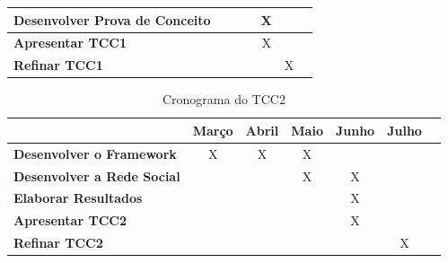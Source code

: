 \begin{table}[h]
\begin{adjustbox}{width=\textwidth}
\begin{tabular}{|l|c|c|c|c|c|c|}
\textbf{Desenvolver Prova de Conceito}          &                             		   &                               			&                              			& X                             		 &                               		  \\ \hline
\textbf{Apresentar TCC1}                        &                             		   &                               			&                              			& X                              		 &                              		  \\ \hline
\textbf{Refinar TCC1}                           &                             		   &                               			&                              			&                               		 & X                              		  \\ \hline
\end{tabular}
\end{adjustbox}
\end{table}

\begin{table}[h]
\centering
\caption{Cronograma do TCC2}
\label{cronograma tcc2}
\begin{tabular}{|l|c|c|c|c|c|c|}
\hline
                                      			& \multicolumn{1}{l|}{\textbf{Março}} & \multicolumn{1}{l|}{\textbf{Abril}} & \multicolumn{1}{l|}{\textbf{Maio}} & \multicolumn{1}{l|}{\textbf{Junho}} & \multicolumn{1}{l|}{\textbf{Julho}} \\ \hline
\textbf{Desenvolver o Framework}                & X                           		  & X                              		& X                            		 &                               	   &                               		 \\ \hline
\textbf{Desenvolver a Rede Social}              &                            		  &                               		& X                            		 & X                              	   &                               		 \\ \hline
\textbf{Elaborar Resultados}				    &                            		  &                              		&                             		 & X                             	   &                               		 \\ \hline
\textbf{Apresentar TCC2}						&                             		  &                              		&                             		 & X                              	   &                               		 \\ \hline
\textbf{Refinar TCC2}				            &                             		  &                               		&                             		 &                               	   & X                             		 \\ \hline
\end{tabular}
\end{table}

